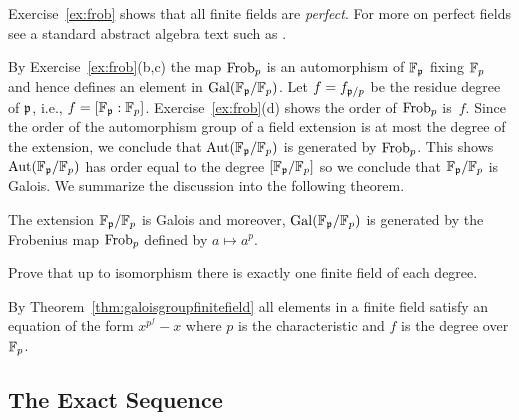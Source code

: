 \begin{remark}
	Exercise~\ref{ex:frob} shows that all finite fields
	are \emph{perfect}. For more on perfect fields see
	a standard abstract algebra text such as
	\cite{dummit2004abstract}.
\end{remark}

By Exercise~\ref{ex:frob}(b,c) the map $\operatorname{Frob}_p$ is an
automorphism of $\mathbb{F}_{\mathfrak{p}}$ fixing $\mathbb{F}_p$ and hence defines
an element in $\operatorname{Gal}(\mathbb{F}_{\mathfrak{p}}/\mathbb{F}_p)$. Let $f = f_{\mathfrak{p}/p}$ be the residue
degree of $\mathfrak{p}$, i.e., $f = [\mathbb{F}_{\mathfrak{p}}:\mathbb{F}_p]$.
Exercise~\ref{ex:frob}(d) shows the order of $\operatorname{Frob}_p$ is~$f$.
Since the order of the automorphism group of a field extension
is at most the degree of the extension, we conclude that
$\operatorname{Aut}(\mathbb{F}_{\mathfrak{p}}/\mathbb{F}_p)$ is generated by $\operatorname{Frob}_p$. This shows
$\operatorname{Aut}(\mathbb{F}_{\mathfrak{p}}/\mathbb{F}_p)$ has order equal to the degree $[\mathbb{F}_{\mathfrak{p}}/\mathbb{F}_p]$
so we conclude that $\mathbb{F}_{\mathfrak{p}}/\mathbb{F}_p$ is Galois.
We summarize the discussion into the following theorem.

\begin{theorem}\label{thm:galoisgroupfinitefield}
	The extension $\mathbb{F}_{\mathfrak{p}}/\mathbb{F}_p$ is Galois and moreover,
	$\operatorname{Gal}(\mathbb{F}_{\mathfrak{p}}/\mathbb{F}_p)$ is generated by the Frobenius map
	$\operatorname{Frob}_p$ defined by $a\mapsto a^p$.
\end{theorem}

\begin{exercise}
	Prove that up to isomorphism there is
	exactly one finite field of each degree.

	\begin{hint}
		By Theorem~\ref{thm:galoisgroupfinitefield}
		all elements in a finite field satisfy an equation
		of the form $x^{p^f} - x$ where $p$ is the
		characteristic and $f$ is the degree over $\mathbb{F}_p$.
	\end{hint}
\end{exercise}


\subsection{The Exact Sequence}\label{sec:exactseq}

